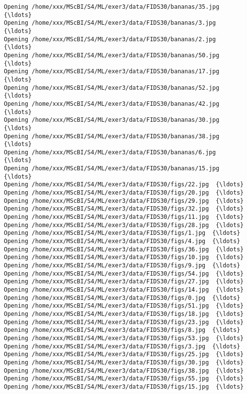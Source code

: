\documentclass[11pt]{article}
\begin{document}
\begin{Verbatim}[commandchars=\\\{\}]
Opening /home/xxx/MScBI/S4/ML/exer3/data/FIDS30/bananas/35.jpg  {\ldots}
Opening /home/xxx/MScBI/S4/ML/exer3/data/FIDS30/bananas/3.jpg  {\ldots}
Opening /home/xxx/MScBI/S4/ML/exer3/data/FIDS30/bananas/2.jpg  {\ldots}
Opening /home/xxx/MScBI/S4/ML/exer3/data/FIDS30/bananas/50.jpg  {\ldots}
Opening /home/xxx/MScBI/S4/ML/exer3/data/FIDS30/bananas/17.jpg  {\ldots}
Opening /home/xxx/MScBI/S4/ML/exer3/data/FIDS30/bananas/52.jpg  {\ldots}
Opening /home/xxx/MScBI/S4/ML/exer3/data/FIDS30/bananas/42.jpg  {\ldots}
Opening /home/xxx/MScBI/S4/ML/exer3/data/FIDS30/bananas/30.jpg  {\ldots}
Opening /home/xxx/MScBI/S4/ML/exer3/data/FIDS30/bananas/38.jpg  {\ldots}
Opening /home/xxx/MScBI/S4/ML/exer3/data/FIDS30/bananas/6.jpg  {\ldots}
Opening /home/xxx/MScBI/S4/ML/exer3/data/FIDS30/bananas/15.jpg  {\ldots}
Opening /home/xxx/MScBI/S4/ML/exer3/data/FIDS30/figs/22.jpg  {\ldots}
Opening /home/xxx/MScBI/S4/ML/exer3/data/FIDS30/figs/20.jpg  {\ldots}
Opening /home/xxx/MScBI/S4/ML/exer3/data/FIDS30/figs/29.jpg  {\ldots}
Opening /home/xxx/MScBI/S4/ML/exer3/data/FIDS30/figs/32.jpg  {\ldots}
Opening /home/xxx/MScBI/S4/ML/exer3/data/FIDS30/figs/11.jpg  {\ldots}
Opening /home/xxx/MScBI/S4/ML/exer3/data/FIDS30/figs/28.jpg  {\ldots}
Opening /home/xxx/MScBI/S4/ML/exer3/data/FIDS30/figs/1.jpg  {\ldots}
Opening /home/xxx/MScBI/S4/ML/exer3/data/FIDS30/figs/4.jpg  {\ldots}
Opening /home/xxx/MScBI/S4/ML/exer3/data/FIDS30/figs/36.jpg  {\ldots}
Opening /home/xxx/MScBI/S4/ML/exer3/data/FIDS30/figs/10.jpg  {\ldots}
Opening /home/xxx/MScBI/S4/ML/exer3/data/FIDS30/figs/9.jpg  {\ldots}
Opening /home/xxx/MScBI/S4/ML/exer3/data/FIDS30/figs/54.jpg  {\ldots}
Opening /home/xxx/MScBI/S4/ML/exer3/data/FIDS30/figs/27.jpg  {\ldots}
Opening /home/xxx/MScBI/S4/ML/exer3/data/FIDS30/figs/14.jpg  {\ldots}
Opening /home/xxx/MScBI/S4/ML/exer3/data/FIDS30/figs/0.jpg  {\ldots}
Opening /home/xxx/MScBI/S4/ML/exer3/data/FIDS30/figs/51.jpg  {\ldots}
Opening /home/xxx/MScBI/S4/ML/exer3/data/FIDS30/figs/18.jpg  {\ldots}
Opening /home/xxx/MScBI/S4/ML/exer3/data/FIDS30/figs/23.jpg  {\ldots}
Opening /home/xxx/MScBI/S4/ML/exer3/data/FIDS30/figs/8.jpg  {\ldots}
Opening /home/xxx/MScBI/S4/ML/exer3/data/FIDS30/figs/53.jpg  {\ldots}
Opening /home/xxx/MScBI/S4/ML/exer3/data/FIDS30/figs/3.jpg  {\ldots}
Opening /home/xxx/MScBI/S4/ML/exer3/data/FIDS30/figs/25.jpg  {\ldots}
Opening /home/xxx/MScBI/S4/ML/exer3/data/FIDS30/figs/30.jpg  {\ldots}
Opening /home/xxx/MScBI/S4/ML/exer3/data/FIDS30/figs/38.jpg  {\ldots}
Opening /home/xxx/MScBI/S4/ML/exer3/data/FIDS30/figs/55.jpg  {\ldots}
Opening /home/xxx/MScBI/S4/ML/exer3/data/FIDS30/figs/15.jpg  {\ldots}

\end{Verbatim}
\end{document}
